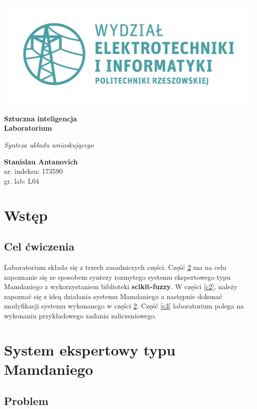 \documentclass[a4paper, 10pt]{article}
\begin{document}
\begin{titlepage}
\begin{center}
	\includegraphics[scale=0.7]{logo.png}

	\vspace*{4cm}
	\textbf{Sztuczna inteligencja\\ Laboratorium}

	\vspace{1.5cm}
	\textit{Synteza układu wnioskującego}

	\vspace{1.5cm}
	\textbf{Stanislau Antanovich}\\
	nr. indeksu: 173590\\
	gr. lab: L04
\end{center}
\end{titlepage}

\tableofcontents
\listoffigures

\newpage
\section{Wstęp}
\subsection{Cel ćwiczenia}

Laboratorium składa się z trzech zasadniczych części. Część \ref{c1} ma na celu zapoznanie się ze sposobem syntezy rozmytego systemu ekspertowego typu Mamdaniego z wykorzystaniem biblioteki \textbf{scikit-fuzzy}. W części \ref{c2}, należy zapoznać się z ideą działania systemu Mamdaniego a następnie dokonać modyfikacji systemu wykonanego w części \ref{c1}. Część \ref{c3} laboratorium polega na wykonaniu przykładowego zadania zaliczeniowego.

\section{System ekspertowy typu Mamdaniego}\label{c1}
\subsection{Problem}
\end{document}
